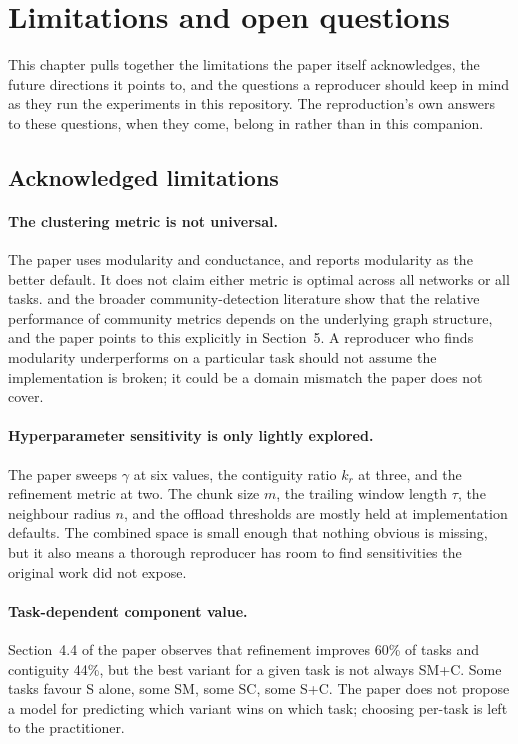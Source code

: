 \section{Limitations and open questions}
\label{sec:limitations}

This chapter pulls together the limitations the paper itself acknowledges, the future directions it points to, and the questions a reproducer should keep in mind as they run the experiments in this repository. The reproduction's own answers to these questions, when they come, belong in  rather than in this companion.

\subsection{Acknowledged limitations}

\paragraph{The clustering metric is not universal.}
The paper uses modularity and conductance, and reports modularity as the better default. It does not claim either metric is optimal across all networks or all tasks. \textcite{fortunato2010community} and the broader community-detection literature show that the relative performance of community metrics depends on the underlying graph structure, and the paper points to this explicitly in Section~5. A reproducer who finds modularity underperforms on a particular task should not assume the implementation is broken; it could be a domain mismatch the paper does not cover.

\paragraph{Hyperparameter sensitivity is only lightly explored.}
The paper sweeps $\gamma$ at six values, the contiguity ratio $k_r$ at three, and the refinement metric at two. The chunk size $m$, the trailing window length $\tau$, the neighbour radius $n$, and the offload thresholds are mostly held at implementation defaults. The combined space is small enough that nothing obvious is missing, but it also means a thorough reproducer has room to find sensitivities the original work did not expose.

\paragraph{Task-dependent component value.}
Section~4.4 of the paper observes that refinement improves 60\% of tasks and contiguity 44\%, but the best variant for a given task is not always SM+C. Some tasks favour S alone, some SM, some SC, some S+C. The paper does not propose a model for predicting which variant wins on which task; choosing per-task is left to the practitioner.

